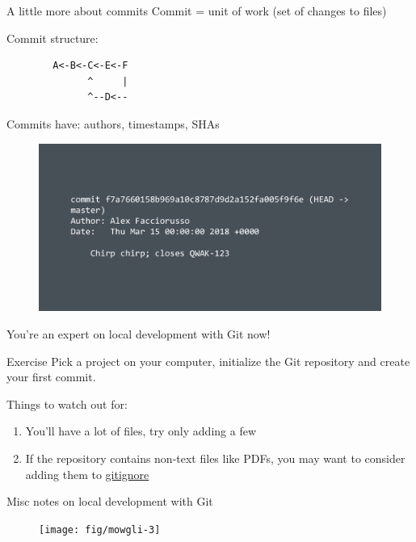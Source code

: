 \documentclass[pdf]{beamer} %
\begin{document}
\begin{frame}[fragile]{A little more about commits}
    Commit = unit of work (set of changes to files)

    \bigskip
    Commit structure: \\
    \begin{verbatim}
        A<-B<-C<-E<-F
              ^     |
              ^--D<--
    \end{verbatim}

    \bigskip
    Commits have: authors, timestamps, SHAs
    
    \begin{figure}[htpb]
        \centering
        \includegraphics[width=0.8\linewidth]{fig/git-commit.png}
        \label{fig:fig/git-commit}
    \end{figure}
\end{frame}

\begin{frame}[t]{You're an expert on local development with Git now!}
    \begin{block}{Exercise} Pick a project on your computer, initialize the Git repository and create your first commit.

        \medskip
        Things to watch out for:
        \begin{enumerate}
            \item You'll have a lot of files, try only adding a few
        \item If the repository contains non-text files like PDFs, you may want to consider adding them to \href{https://git-scm.com/docs/gitignore}{gitignore}
        \end{enumerate}
    \end{block}
\end{frame}


\begin{frame}[t]{Misc notes on local development with Git}
    \begin{figure}[htpb]
        \centering
        \texttt{[image: fig/mowgli-3]}
        \label{fig:fig/mowgli-3}
    \end{figure}
\end{frame}
\end{document}
